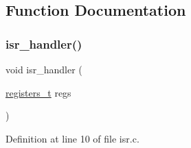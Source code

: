 \subsection{Function Documentation}
\mbox{\label{a00080_a700e3ca056bf69296370f504f2cb6cc8_a700e3ca056bf69296370f504f2cb6cc8}} 
\subsubsection{\texorpdfstring{isr\+\_\+handler()}{isr\_handler()}}
{\footnotesize\ttfamily void isr\+\_\+handler (\begin{DoxyParamCaption}\item[{\hyperlink{a00080_adf58dbaf6139b4957c348711f2026957_adf58dbaf6139b4957c348711f2026957}{registers\+\_\+t}}]{regs }\end{DoxyParamCaption})}



Definition at line 10 of file isr.\+c.



